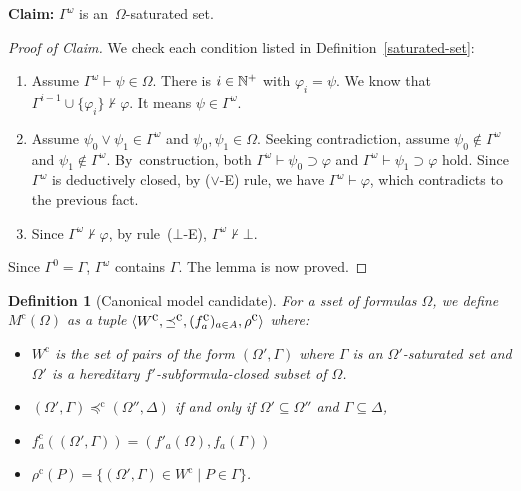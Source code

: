 \documentclass[doctor]{iscs-thesis}
\newtheorem{definition}{Definition}
\begin{document}
\noindent \textbf{Claim:}
$\Gamma^\omega$ is an~$\Omega$-saturated set.
\begin{proof}[Proof of Claim]
We check each condition listed in
 Definition~\ref{saturated-set}:
\begin{enumerate}
 \item  Assume $\Gamma^\omega \vdash \psi\in\Omega$. There is $i\in{\mathbb N}^{+}$ with $\varphi_i = \psi$.
 We know that $\Gamma^{i-1}\cup\{\varphi_i\}\not\vdash\varphi$. It means
 $\psi\in\Gamma^\omega$.
 \item Assume $\psi_0\vee\psi_1\in\Gamma^\omega$ and $\psi_0,\psi_1\in\Omega$.
       Seeking contradiction, assume $\psi_0\notin\Gamma^\omega$ and
       $\psi_1\notin\Gamma^\omega$.
       By~construction, both $\Gamma^\omega\vdash \psi_0\supset \varphi$ and 
       $\Gamma^\omega\vdash\psi_1\supset \varphi$ hold.
       Since $\Gamma^\omega$ is deductively closed, by ($\vee$-E) rule, we have $\Gamma^\omega\vdash\varphi$,
       which contradicts to the previous fact.
 \item Since $\Gamma^\omega\not\vdash\varphi$, by rule~($\bot$-E), $\Gamma^\omega\not\vdash\bot$.
\end{enumerate}

\noindent Since $\Gamma^0 = \Gamma$\kern -2pt, $\Gamma^\omega$ contains $\Gamma$\kern -2pt. 
The lemma is now proved.
\end{proof}

\newcommand{\canon}[1]{#1^{\mbox{c}}}
\begin{definition}[Canonical model candidate]
\label{cancan}
 For a sset of formulas $\Omega$,
 we define $\canon M(\Omega)$ as a tuple $\langle{W^{\mbox{c}}, \preceq^{\mbox{c}}, (f_a^{\mbox{c}})_{a\in A}, \rho^{\mbox{c}}}\rangle$ where:
\begin{itemize}
 \item $\canon W$ is the set of pairs of the form $(\Omega', \Gamma)$ where
       $\Gamma$ is an $\Omega'$-saturated set and
       $\Omega'$ is a hereditary $f'$-subformula-closed subset of $\Omega$.
 \item $(\Omega', \Gamma)\canon\preceq(\Omega'',\Delta)$ if and only if
       $\Omega'\subseteq \Omega''$ and $\Gamma\subseteq\Delta$,
 \item $\canon f_a((\Omega',\Gamma)) = (f'_a(\Omega), f_a(\Gamma))$
 \item $\canon \rho(P) = \{(\Omega',\Gamma)\in \canon W\mid P\in\Gamma\}$.
\end{itemize}
\end{definition}
\end{document}
